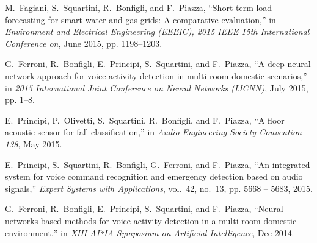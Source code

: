\begin{list}{[]~}{}
\item
M.~Fagiani, S.~Squartini, R.~Bonfigli, and F.~Piazza, ``Short-term
  load forecasting for smart water and gas grids: A comparative evaluation,''
  in \emph{Environment and Electrical Engineering (EEEIC), 2015 IEEE 15th
  International Conference on}, June 2015, pp. 1198--1203.

\item
G.~Ferroni, R.~Bonfigli, E.~Principi, S.~Squartini, and F.~Piazza, ``A
  deep neural network approach for voice activity detection in multi-room
  domestic scenarios,'' in \emph{2015 International Joint Conference on Neural
  Networks (IJCNN)}, July 2015, pp. 1--8.

\item
E.~Principi, P.~Olivetti, S.~Squartini, R.~Bonfigli, and F.~Piazza,
  ``A floor acoustic sensor for fall classification,'' in \emph{Audio
  Engineering Society Convention 138}, May 2015.

\item
E.~Principi, S.~Squartini, R.~Bonfigli, G.~Ferroni, and F.~Piazza,
  ``An integrated system for voice command recognition and emergency detection
  based on audio signals,'' \emph{Expert Systems with Applications}, vol.~42,
  no.~13, pp. 5668 -- 5683, 2015.

\item
G.~Ferroni, R.~Bonfigli, E.~Principi, S.~Squartini, and F.~Piazza,
  ``Neural networks based methods for voice activity detection in a multi-room
  domestic environment,'' in \emph{XIII AI*IA Symposium on Artificial
  Intelligence}, Dec 2014.
  
\end{list}